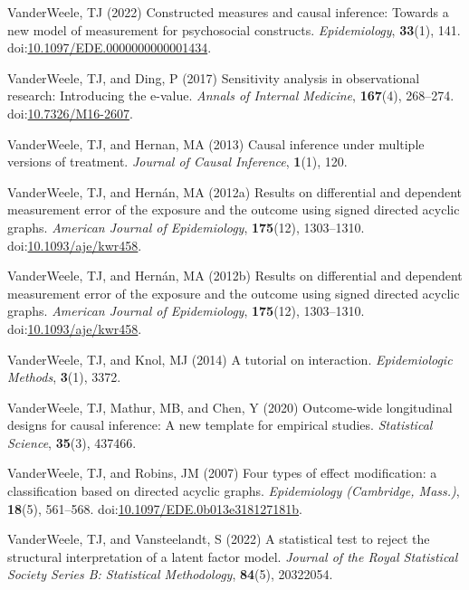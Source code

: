\documentclass[
  singlecolumn]{article}
\newlength{\cslhangindent}
\newenvironment{CSLReferences}[2] %
 {\begin{list}{}{%
  \setlength{\itemindent}{0pt}
  \setlength{\leftmargin}{0pt}
  \setlength{\parsep}{0pt}
  \ifodd #1
   \setlength{\leftmargin}{\cslhangindent}
   \setlength{\itemindent}{-1\cslhangindent}
  \fi
  \setlength{\itemsep}{#2\baselineskip}}}
 {\end{list}}
\begin{document}
\begin{CSLReferences}{1}{0}
VanderWeele, TJ (2022) Constructed measures and causal inference:
Towards a new model of measurement for psychosocial constructs.
\emph{Epidemiology}, \textbf{33}(1), 141.
doi:\href{https://doi.org/10.1097/EDE.0000000000001434}{10.1097/EDE.0000000000001434}.

VanderWeele, TJ, and Ding, P (2017) Sensitivity analysis in
observational research: Introducing the e-value. \emph{Annals of
Internal Medicine}, \textbf{167}(4), 268--274.
doi:\href{https://doi.org/10.7326/M16-2607}{10.7326/M16-2607}.

VanderWeele, TJ, and Hernan, MA (2013) Causal inference under multiple
versions of treatment. \emph{Journal of Causal Inference},
\textbf{1}(1), 120.

VanderWeele, TJ, and Hernán, MA (2012a) Results on differential and
dependent measurement error of the exposure and the outcome using signed
directed acyclic graphs. \emph{American Journal of Epidemiology},
\textbf{175}(12), 1303--1310.
doi:\href{https://doi.org/10.1093/aje/kwr458}{10.1093/aje/kwr458}.

VanderWeele, TJ, and Hernán, MA (2012b) Results on differential and
dependent measurement error of the exposure and the outcome using signed
directed acyclic graphs. \emph{American Journal of Epidemiology},
\textbf{175}(12), 1303--1310.
doi:\href{https://doi.org/10.1093/aje/kwr458}{10.1093/aje/kwr458}.

VanderWeele, TJ, and Knol, MJ (2014) A tutorial on interaction.
\emph{Epidemiologic Methods}, \textbf{3}(1), 3372.

VanderWeele, TJ, Mathur, MB, and Chen, Y (2020) Outcome-wide
longitudinal designs for causal inference: A new template for empirical
studies. \emph{Statistical Science}, \textbf{35}(3), 437466.

VanderWeele, TJ, and Robins, JM (2007) Four types of effect
modification: a classification based on directed acyclic graphs.
\emph{Epidemiology (Cambridge, Mass.)}, \textbf{18}(5), 561--568.
doi:\href{https://doi.org/10.1097/EDE.0b013e318127181b}{10.1097/EDE.0b013e318127181b}.

VanderWeele, TJ, and Vansteelandt, S (2022) A statistical test to reject
the structural interpretation of a latent factor model. \emph{Journal of
the Royal Statistical Society Series B: Statistical Methodology},
\textbf{84}(5), 20322054.


\end{CSLReferences}
\end{document}
